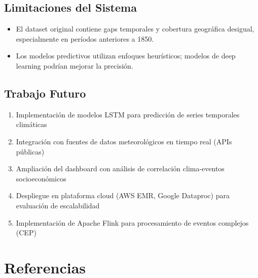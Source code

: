 \documentclass[12pt,a4paper]{scrartcl}
\begin{document}
\subsection{Limitaciones del Sistema}

\begin{itemize}
    \item El dataset original contiene gaps temporales y cobertura geográfica desigual, especialmente en períodos anteriores a 1850.
    
    \item Los modelos predictivos utilizan enfoques heurísticos; modelos de deep learning podrían mejorar la precisión.
    
\end{itemize}

\subsection{Trabajo Futuro}

\begin{enumerate}
    \item Implementación de modelos LSTM para predicción de series temporales climáticas
    \item Integración con fuentes de datos meteorológicos en tiempo real (APIs públicas)
    \item Ampliación del dashboard con análisis de correlación clima-eventos socioeconómicos
    \item Despliegue en plataforma cloud (AWS EMR, Google Dataproc) para evaluación de escalabilidad
    \item Implementación de Apache Flink para procesamiento de eventos complejos (CEP)
\end{enumerate}


\section{Referencias}
\end{document}
